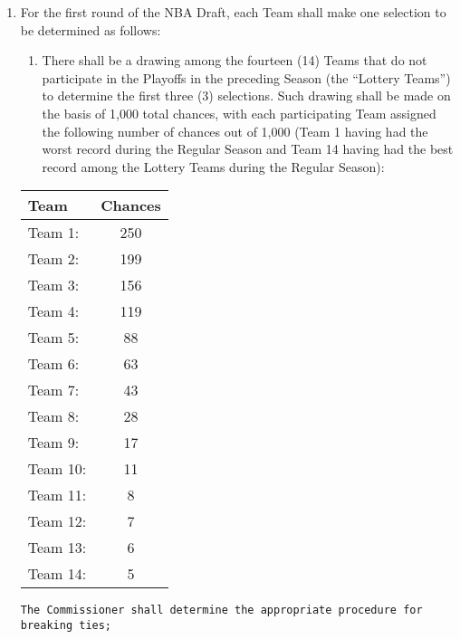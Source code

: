 \documentclass[]{book}
\providecommand{\tightlist}{%
  \setlength{\itemsep}{0pt}\setlength{\parskip}{0pt}}
\theoremstyle{definition}
\theoremstyle{definition}
\theoremstyle{definition}
\theoremstyle{remark}
\begin{document}
\begin{enumerate}
\def\labelenumi{(\alph{enumi})}
\tightlist
\item
  For the first round of the NBA Draft, each Team shall make one
  selection to be determined as follows:

  \begin{enumerate}
  \def\labelenumii{(\roman{enumii})}
  \tightlist
  \item
    There shall be a drawing among the fourteen (14) Teams that do not
    participate in the Playoffs in the preceding Season (the ``Lottery
    Teams'') to determine the first three (3) selections. Such drawing
    shall be made on the basis of 1,000 total chances, with each
    participating Team assigned the following number of chances out of
    1,000 (Team 1 having had the worst record during the Regular Season
    and Team 14 having had the best record among the Lottery Teams
    during the Regular Season):
  \end{enumerate}

  \begin{longtable}[]{@{}lc@{}}
  \toprule
  Team & Chances\tabularnewline
  \midrule
  \endhead
  Team 1: & 250\tabularnewline
  Team 2: & 199\tabularnewline
  Team 3: & 156\tabularnewline
  Team 4: & 119\tabularnewline
  Team 5: & 88\tabularnewline
  Team 6: & 63\tabularnewline
  Team 7: & 43\tabularnewline
  Team 8: & 28\tabularnewline
  Team 9: & 17\tabularnewline
  Team 10: & 11\tabularnewline
  Team 11: & 8\tabularnewline
  Team 12: & 7\tabularnewline
  Team 13: & 6\tabularnewline
  Team 14: & 5\tabularnewline
  \bottomrule
  \end{longtable}

\begin{verbatim}
The Commissioner shall determine the appropriate procedure for breaking ties;
\end{verbatim}


\end{enumerate}
\end{document}
